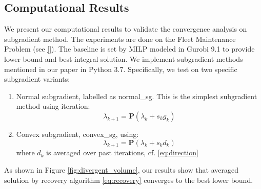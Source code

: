 \documentclass[../main]{subfiles}
\begin{document}









\subsection{Computational Results}\label{computational-results}

We present our computational results to validate the convergence analysis on subgradient method.
The experiments are done on the Fleet Maintenance Problem (see \ref{}).
The baseline is set by MILP modeled in Gurobi 9.1 to provide lower bound and best integral solution.
We implement subgradient methods mentioned in our paper in Python 3.7. Specifically, we test on two specific subgradient variants:

\begin{enumerate}
  \item Normal subgradient, labelled as \textsf{normal\_sg}. This is the simplest subgradient method using iteration:
        \[\lambda_{k+1} = \mathbf{P}(\lambda_{k} + s_{k}g_{k})\]
  \item Convex subgradient, \textsf{convex\_sg}, using:
        \[\lambda_{k+1} = \mathbf{P}(\lambda_{k} + s_{k}d_{k})\]
        where \(d_k\) is averaged over past iterations, cf. \eqref{eq:direction}
\end{enumerate}

As shown in Figure \ref{fig:divergent_volume}, our results show that averaged solution by recovery algorithm \eqref{eq:recovery} converges to the best lower bound.
\end{document}
